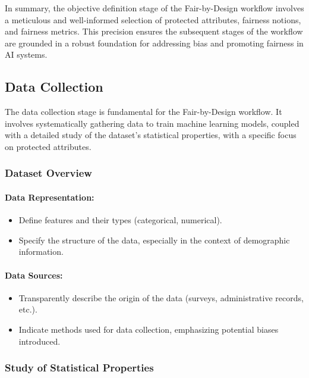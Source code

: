 In summary, the objective definition stage of the Fair-by-Design workflow involves a meticulous and well-informed selection of protected attributes, fairness notions, and fairness metrics. This precision ensures the subsequent stages of the workflow are grounded in a robust foundation for addressing bias and promoting fairness in AI systems.

\subsection{Data Collection}
\label{subsection:data_collection}

The data collection stage is fundamental for the Fair-by-Design workflow. It involves systematically gathering data to train machine learning models, coupled with a detailed study of the dataset's statistical properties, with a specific focus on protected attributes.

\subsubsection{Dataset Overview}

\paragraph{Data Representation:}
\begin{itemize}
    \item Define features and their types (categorical, numerical).
    \item Specify the structure of the data, especially in the context of demographic information.
\end{itemize}

\paragraph{Data Sources:}
\begin{itemize}
    \item Transparently describe the origin of the data (surveys, administrative records, etc.).
    \item Indicate methods used for data collection, emphasizing potential biases introduced.
\end{itemize}

\subsubsection{Study of Statistical Properties}


